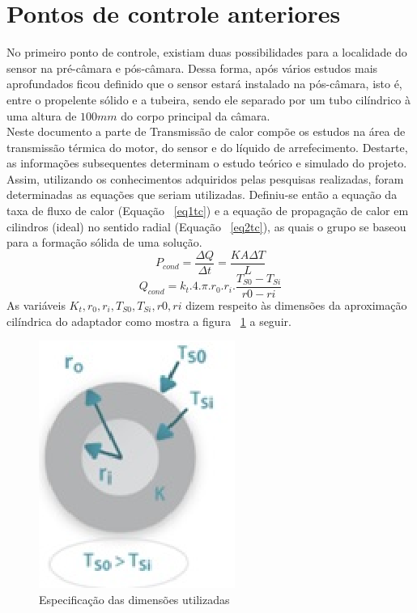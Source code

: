 \section{Pontos de controle anteriores}
No primeiro ponto de controle, existiam duas possibilidades para a localidade do sensor na pré-câmara e pós-câmara. Dessa forma, após vários estudos mais aprofundados ficou definido que o sensor estará instalado na pós-câmara, isto é, entre o propelente sólido e a tubeira, sendo ele separado por um tubo cilíndrico à uma altura de $100mm$ do corpo principal da câmara.\\
Neste documento a parte de Transmissão de calor compõe os estudos na área de transmissão térmica do motor, do sensor e do líquido de arrefecimento. Destarte, as informações subsequentes determinam o estudo teórico e simulado do projeto.\\
Assim, utilizando os conhecimentos adquiridos pelas pesquisas realizadas, foram determinadas as equações que seriam utilizadas. Definiu-se então a equação da taxa de fluxo de calor (Equação ~\ref{eq1tc}) e a equação de propagação de calor em cilindros (ideal) no sentido radial (Equação ~\ref{eq2tc}), as quais o grupo se baseou para a formação sólida de uma solução.
\begin{equation}\label{eq1tc}
P_{cond}=\frac{\Delta Q}{\Delta t}=\frac{KA\Delta T}{L}
\end{equation}
\begin{equation}\label{eq2tc}
Q_{cond}=k_t.4.\pi.r_0.r_i.\frac{T_{S0}-T_{Si}}{r0-ri}
\end{equation}
As variáveis $K_t,r_0,r_i,T_{S0},T_{Si},r0,ri$ dizem respeito às dimensões da aproximação cilíndrica do adaptador como mostra a figura ~\ref{fig3tc} a seguir.
\begin{figure}[!htb]                  
	\centering                          
	\includegraphics[scale=1]{figuras/Figura3tc.eps}
	\caption{Especificação das dimensões utilizadas}\label{fig3tc}               
\end{figure}
